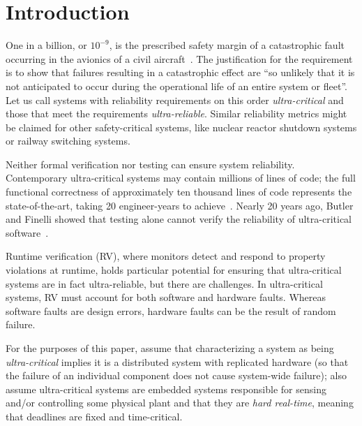 \section{Introduction}

One in a billion, or $10^{-9}$, is the prescribed safety margin of a
catastrophic fault occurring in the avionics of a civil
aircraft~\cite{Rushby09:SEFM}.  The justification for the requirement
is to show that failures resulting in a catastrophic effect are ``so
unlikely that it is not anticipated to occur during the operational
life of an entire system or fleet''\cite{FAA2000}. Let us call systems
with reliability requirements on this order \emph{ultra-critical} and
those that meet the requirements \emph{ultra-reliable}.  Similar
reliability metrics might be claimed for other safety-critical
systems, like nuclear reactor shutdown systems or railway switching
systems.

Neither formal verification nor testing can ensure system reliability.
Contemporary ultra-critical systems may contain millions of lines of code; the
full functional correctness of approximately ten thousand lines of code
represents the state-of-the-art, taking 20 engineer-years to achieve~\cite{l4}.
Nearly 20 years ago, Butler and Finelli showed that testing alone cannot verify
the reliability of ultra-critical software~\cite{butler}.

Runtime verification (RV), where monitors detect and respond to property
violations at runtime, holds particular potential for ensuring that
ultra-critical systems are in fact ultra-reliable, but there are challenges.  In
ultra-critical systems, RV must account for both software and hardware faults.
Whereas software faults are design errors, hardware faults can be the result of
random failure.  

For the purposes of this paper, assume that characterizing a system as
being \emph{ultra-critical} implies it is a distributed system with replicated
hardware (so that the failure of an individual component does not cause system-wide
failure); also assume ultra-critical systems are embedded systems
responsible for 
sensing and/or controlling some physical plant and that they are \emph{hard
  real-time}, meaning that deadlines are fixed and time-critical.  %



